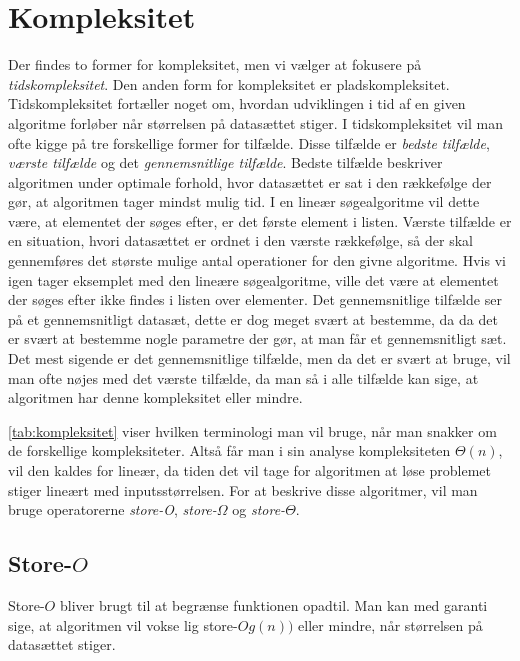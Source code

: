 \section{Kompleksitet} \label{kap:kompleksitet}

Der findes to former for kompleksitet, men vi vælger at fokusere på \emph{tidskompleksitet}. Den anden form for kompleksitet er pladskompleksitet. 
Tidskompleksitet fortæller noget om, hvordan udviklingen i tid af en given algoritme forløber når størrelsen på datasættet stiger. I tidskompleksitet vil man ofte kigge på tre forskellige former for tilfælde. Disse tilfælde er \emph{bedste tilfælde}, \emph{værste tilfælde} og det \emph{gennemsnitlige tilfælde}. 
Bedste tilfælde beskriver algoritmen under optimale forhold, hvor datasættet er sat i den rækkefølge der gør, at algoritmen tager mindst mulig tid. I en lineær søgealgoritme vil dette være, at elementet der søges efter, er det første element i listen. 
Værste tilfælde er en situation, hvori datasættet er ordnet i den værste rækkefølge, så der skal gennemføres det største mulige antal operationer for den givne algoritme. Hvis vi igen tager eksemplet med den lineære søgealgoritme, ville det være at elementet der søges efter ikke findes i listen over elementer.
Det gennemsnitlige tilfælde ser på et gennemsnitligt datasæt, dette er dog meget svært at bestemme, da da det er svært at bestemme nogle parametre der gør, at man får et gennemsnitligt sæt.
Det mest sigende er det gennemsnitlige tilfælde, men da det er svært at bruge, vil man ofte nøjes med det værste tilfælde, da man så i alle tilfælde kan sige, at algoritmen har denne kompleksitet eller mindre.





\autoref{tab:kompleksitet} viser hvilken terminologi man vil bruge, når man snakker om de forskellige kompleksiteter. Altså får man i sin analyse kompleksiteten $\Theta(n)$, vil den kaldes for lineær, da tiden det vil tage for algoritmen at løse problemet stiger lineært med inputsstørrelsen.
For at beskrive disse algoritmer, vil man bruge operatorerne \emph{store-O}, \emph{store-$\Omega$} og \emph{store-$\Theta$}. 
\subsection{Store-$O$}
Store-$O$ bliver brugt til at begrænse funktionen opadtil. Man kan med garanti sige, at algoritmen vil vokse lig store-$Og(n))$ eller mindre, når størrelsen på datasættet stiger.

